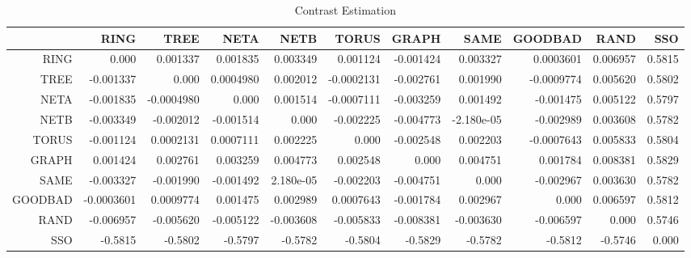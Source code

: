 \documentclass[a4paper,10pt]{article}
\begin{document}
\begin{landscape}
\begin{table}[!htp]
\centering\tiny
\caption{Contrast Estimation}
\begin{tabular}{
|r|r|r|r|r|r|r|r|r|r|r|}
\hline
 & RING& TREE& NETA& NETB& TORUS& GRAPH& SAME& GOODBAD& RAND& SSO\\
\hline
 RING&0.000&0.001337&0.001835&0.003349&0.001124&-0.001424&0.003327&0.0003601&0.006957&0.5815\\
\hline
 TREE&-0.001337&0.000&0.0004980&0.002012&-0.0002131&-0.002761&0.001990&-0.0009774&0.005620&0.5802\\
\hline
 NETA&-0.001835&-0.0004980&0.000&0.001514&-0.0007111&-0.003259&0.001492&-0.001475&0.005122&0.5797\\
\hline
 NETB&-0.003349&-0.002012&-0.001514&0.000&-0.002225&-0.004773&-2.180e-05&-0.002989&0.003608&0.5782\\
\hline
 TORUS&-0.001124&0.0002131&0.0007111&0.002225&0.000&-0.002548&0.002203&-0.0007643&0.005833&0.5804\\
\hline
 GRAPH&0.001424&0.002761&0.003259&0.004773&0.002548&0.000&0.004751&0.001784&0.008381&0.5829\\
\hline
 SAME&-0.003327&-0.001990&-0.001492&2.180e-05&-0.002203&-0.004751&0.000&-0.002967&0.003630&0.5782\\
\hline
 GOODBAD&-0.0003601&0.0009774&0.001475&0.002989&0.0007643&-0.001784&0.002967&0.000&0.006597&0.5812\\
\hline
 RAND&-0.006957&-0.005620&-0.005122&-0.003608&-0.005833&-0.008381&-0.003630&-0.006597&0.000&0.5746\\
\hline
 SSO&-0.5815&-0.5802&-0.5797&-0.5782&-0.5804&-0.5829&-0.5782&-0.5812&-0.5746&0.000\\
\hline

\end{tabular}
\end{table}

\newpage


\end{landscape}
\end{document}
